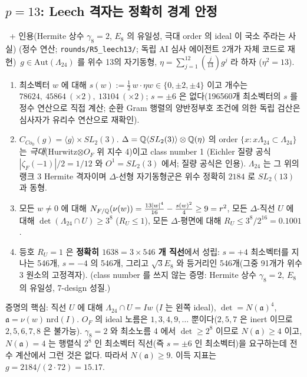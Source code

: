 \subsection{$p=13$: Leech 격자는 정확히 경계 안정}
\begin{theorem}\label{thm:leech}\tagPC\ + 인용(Hermite 상수 $\gamma_8=2$, $E_8$ 의 유일성, 극대 order 의 ideal 이 국소 주라는 사실) (정수 연산; \texttt{rounds/R5\_leech13/}; 독립 AI 심사 에이전트 2개가 자체 코드로 재현)\
$g\in\mathrm{Aut}(\Lambda_{24})$ 를 위수 13의 자기동형, $\eta=\sum_{j=1}^{12}(\tfrac j{13})g^j$ 라 하자 ($\eta^2=13$).
\begin{enumerate}
\item 최소벡터 $w$ 에 대해 $s(w):=\tfrac12\,w\cdot\eta w\in\{0,\pm2,\pm4\}$ 이고 개수는 $78624,\ 45864\ (\times2),\ 13104\ (\times2)$; $s=\pm6$ 은 없다(196560개 최소벡터의 $s$ 를 정수 연산으로 직접 계산; 순환 Gram 행렬의 양반정부호 조건에 의한 독립 검산은 심사자가 유리수 연산으로 재확인).
\item $C_{Co_0}(g)=\langle g\rangle\times SL_2(3)$. $\Delta=\mathbb{Q}\langle SL_2(3)\rangle\otimes\mathbb{Q}(\eta)$ 의 order $\{x:x\Lambda_{24}\subset\Lambda_{24}\}$ 는 \emph{극대}(Hurwitz$\otimes O_F$ 위 지수 4)이고 class number 1 (Eichler 질량 공식 $|\zeta_F(-1)|/2=1/12$ 와 $O^1=SL_2(3)$ 에서; 질량 공식은 인용). $\Lambda_{24}$ 는 그 위의 랭크 3 Hermite 격자이며 $\Delta$-선형 자기동형군은 위수 정확히 $2184$ 로 $SL_2(13)$ 과 동형.
\item 모든 $w\ne0$ 에 대해 $N_{F/\mathbb{Q}}(\nu(w))=\tfrac{13|w|^4}{16}-\tfrac{s(w)^2}4\ge9=r^2$, 모든 $\Delta$-직선 $U$ 에 대해 $\det(\Lambda_{24}\cap U)\ge3^8$ ($R_U\le1$), 모든 $\Delta$-평면에 대해 $R_U\le3^8/2^{16}=0.1001$.
\item 등호 $R_U=1$ 은 \textbf{정확히 $1638=3\times546$ 개 직선}에서 성립: $s=+4$ 최소벡터를 지나는 546개, $s=-4$ 의 546개, 그리고 $\sqrt3E_8$ 와 등거리인 546개(그중 91개가 위수 3 원소의 고정격자). (class number 를 쓰지 않는 증명: Hermite 상수 $\gamma_8=2$, $E_8$ 의 유일성, 7-design 성질.)
\end{enumerate}
\end{theorem}
증명의 핵심: 직선 $U$ 에 대해 $\Lambda_{24}\cap U=Iw$ ($I$ 는 왼쪽 ideal), $\det=N(\mathfrak a)^4$, $\mathfrak a=\nu(w)\,\mathrm{nrd}(I)$. $O_F$ 의 ideal 노름은 $1,3,4,9,\dots$ 뿐이다($2,5,7$ 은 inert 이므로 $2,5,6,7,8$ 은 불가능). $\gamma_8=2$ 와 최소노름 4 에서 $\det\ge2^8$ 이므로 $N(\mathfrak a)\ge4$ 이고, $N(\mathfrak a)=4$ 는 행렬식 $2^8$ 인 최소벡터 직선(즉 $s=\pm6$ 인 최소벡터)을 요구하는데 전수 계산에서 그런 것은 없다. 따라서 $N(\mathfrak a)\ge9$. 이득 지표는 $g=2184/(2\cdot72)=15.17$.

